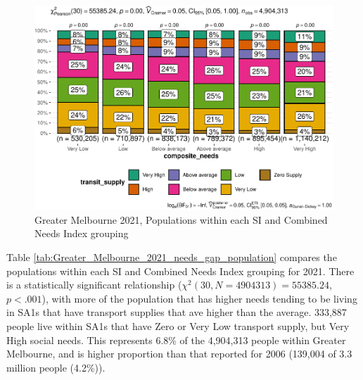 \documentclass[preprint, 3p,
authoryear]{elsarticle} %
\begin{document}
\begin{figure}
\centering
\includegraphics{Leveraging_GTFS_to_assess_transit_supply_Transport_Geography_files/figure-latex/Greater_Melbourne_2021_needs_gap_population-1.pdf}
\caption{Greater Melbourne 2021, Populations within each SI and Combined
Needs Index grouping}
\end{figure}

Table \ref{tab:Greater_Melbourne_2021_needs_gap_population} compares the
populations within each SI and Combined Needs Index grouping for 2021.
There is a statistically significant relationship
(\(\chi^2(30, N = 4904313) = 55385.24\), \(p < .001\)), with more of the
population that has higher needs tending to be living in SA1s that have
transport supplies that ave higher than the average. 333,887 people live
within SA1s that have Zero or Very Low transport supply, but Very High
social needs. This represents 6.8\% of the 4,904,313 people within
Greater Melbourne, and is higher proportion than that reported for 2006
(139,004 of 3.3 million people (4.2\%)).
\end{document}
